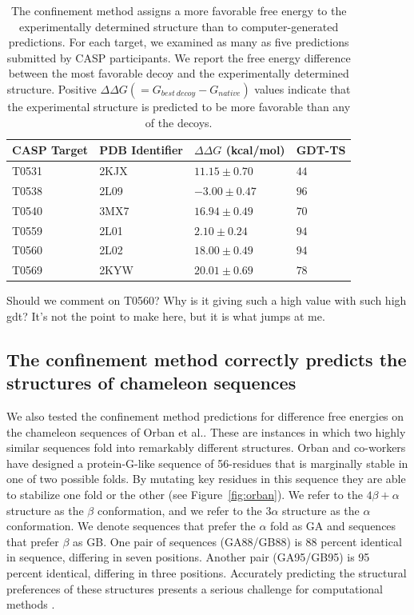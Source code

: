 \documentclass[12pt]{article}
\newcommand{\Alberto}[1]{\color{ForestGreen}#1\normalcolor }
\begin{document}
\begin{table}
\begin{center}
\caption{The confinement method assigns a more favorable free energy to the experimentally determined structure than to
    computer-generated predictions. For each target, we examined as many as five predictions submitted by CASP
    participants. We report the free energy difference between the most favorable decoy and the experimentally
    determined structure. Positive $\Delta\Delta G (=G_{best~decoy} - G_{native})$ values indicate that the experimental structure is predicted to be
    more favorable than any of the decoys.}
\label{table:casp_control}
\begin{tabular}{l l l l}\hline
    CASP Target  & PDB Identifier & $\Delta \Delta G$ (kcal/mol) & GDT-TS \\ \hline
     T0531       &    2KJX        &          $11.15 \pm 0.70$    &  $44$ \\ \hline
     T0538       &    2L09        &          $-3.00 \pm 0.47$    &  $96$ \\ \hline
     T0540       &    3MX7        &          $16.94 \pm 0.49$    &  $70$ \\ \hline
     T0559       &    2L01        &          $2.10 \pm 0.24$     &  $94$ \\ \hline
     T0560       &    2L02        &          $18.00 \pm 0.49$    &  $94$ \\ \hline
     T0569       &    2KYW        &          $20.01 \pm 0.69$    &  $78$ \\ \hline
\end{tabular}
\end{center}
\end{table}
\Alberto{Should we comment on T0560? Why is it giving such a high value with such high gdt? It's not
the point to make here, but it is what jumps at me.}

\subsection*{The confinement method correctly predicts the structures of chameleon sequences}

We also tested the confinement method predictions for difference free energies on the chameleon sequences of Orban et
al.\cite{Alexander2007,He2008,Alexander2009,Bryan2010,He2012}. These are instances in which two highly
similar sequences fold into remarkably different structures. Orban and co-workers have designed a protein-G-like
sequence of 56-residues that is marginally stable in one of two possible folds. By mutating key residues in this
sequence they are able to stabilize one fold or the other (see Figure~\ref{fig:orban}). We refer to the $4\beta +
\alpha$ structure as the $\beta$ conformation, and we refer to the $3\alpha$ structure as the
$\alpha$ conformation. We denote sequences that prefer the $\alpha$ fold as GA and sequences that
prefer $\beta$ as GB. One
pair of sequences (GA88/GB88) is 88 percent identical in sequence, differing in seven positions. Another pair
(GA95/GB95) is 95 percent identical, differing in three positions. Accurately predicting the structural preferences of
these structures presents a serious challenge for computational
methods \cite{Allison2011}. 
\end{document}
